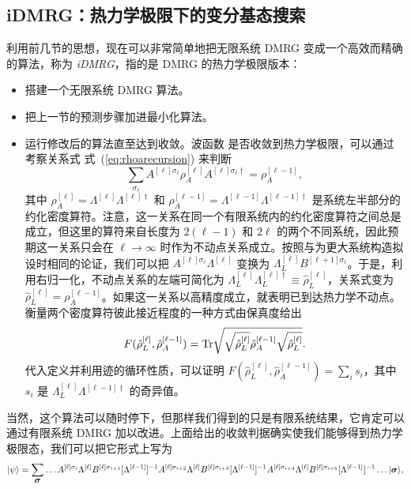 \documentclass[a4paper,10pt,oneside,onecolumn,1p,times]{elsarticle}
\newcommand{\tr}{{\rm Tr }}
\newcommand{\ket}[1]{\mbox{$| #1  \rangle$}}
\newcommand{\fat}[1]{\mbox{\boldmath$#1$\unboldmath}}	%
\begin{document}
\subsection{iDMRG：热力学极限下的变分基态搜索}
利用前几节的思想，现在可以非常简单地把无限系统 DMRG 变成一个高效而精确的算法，称为 {\em iDMRG}，指的是 DMRG 的热力学极限版本：
\begin{itemize}
\item 搭建一个无限系统 DMRG 算法。
\item 把上一节的预测步骤加进最小化算法。
\item 运行修改后的算法直至达到收敛。波函数
是否收敛到热力学极限，可以通过考察关系式 式~(\ref{eq:rhoarecursion}) 来判断
\begin{equation}
\sum_{\sigma_\ell} A^{[\ell]\sigma_\ell} \rho_A^{[\ell]} A^{[\ell]\sigma_\ell\dagger} = \rho_A^{[\ell-1]} ,
\end{equation}
其中 $\rho_A^{[\ell]} = \Lambda^{[\ell]}\Lambda^{[\ell]\dagger}$ 和 $\rho_A^{[\ell-1]} = \Lambda^{[\ell-1]}\Lambda^{[\ell-1]\dagger}$ 是系统左半部分的约化密度算符。注意，这一关系在同一个有限系统内的约化密度算符之间总是成立，但这里的算符来自长度为 $2(\ell-1)$ 和 $2\ell$ 的两个不同系统，因此预期这一关系只会在 $\ell\rightarrow\infty$ 时作为不动点关系成立。按照与为更大系统构造拟设时相同的论证，我们可以把 $A^{[\ell]\sigma_\ell}\Lambda^{[\ell]}$ 变换为 $\Lambda^{[\ell]}_L B^{[\ell+1]\sigma_\ell}$。于是，利用右归一化，不动点关系的左端可简化为 $\Lambda^{[\ell]}_L\Lambda^{[\ell]\dagger}_L \equiv \hat{\rho}^{[\ell]}_L$，关系式变为 $\hat{\rho}^{[\ell]}_L = \rho_A^{[\ell-1]}$。如果这一关系以高精度成立，就表明已到达热力学不动点。  
衡量两个密度算符彼此接近程度的一种方式由保真度给出 \cite{McCulloch08}
\begin{equation}
F(\hat{\rho}^{[\ell]}_L, \hat{\rho}_A^{[\ell-1]}) = \tr \sqrt{\sqrt{\hat{\rho}^{[\ell]}_L}\hat{\rho}_A^{[\ell-1]} \sqrt{\hat{\rho}^{[\ell]}_L}} .
\end{equation}
代入定义并利用迹的循环性质，可以证明 $F(\hat{\rho}^{[\ell]}_L, \hat{\rho}^{[\ell-1]}_A) = \sum_i s_i$，其中 $s_i$ 是  $\Lambda^{[\ell]}_L \Lambda^{[\ell-1]\dagger}$ 的奇异值。 
\end{itemize}
当然，这个算法可以随时停下，但那样我们得到的只是有限系统结果，它肯定可以通过有限系统 DMRG 加以改进。上面给出的收敛判据确实使我们能够得到热力学极限态，我们可以把它形式上写为
\begin{equation}
\ket{\psi} = \sum_{\fat{\sigma}} \ldots A^{[\ell]\sigma_i}\Lambda^{[\ell]} B^{[\ell]\sigma_{i+1}} [\Lambda^{[\ell-1]}]^{-1}A^{[\ell]\sigma_{i+2}}\Lambda^{[\ell]} B^{[\ell]\sigma_{i+3}} [\Lambda^{[\ell-1]}]^{-1}A^{[\ell]\sigma_{i+4}}\Lambda^{[\ell]} B^{[\ell]\sigma_{i+5}} [\Lambda^{[\ell-1]}]^{-1} \ldots 
 \ket{\fat{\sigma}} ,
\end{equation}
\end{document}

